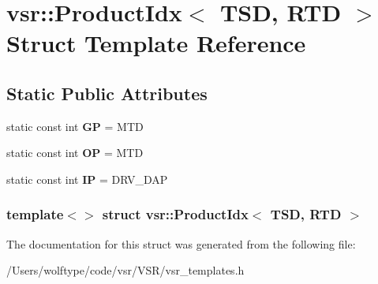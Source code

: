 \hypertarget{structvsr_1_1_product_idx_3_01_t_s_d_00_01_r_t_d_01_4}{\section{vsr\-:\-:Product\-Idx$<$ T\-S\-D, R\-T\-D $>$ Struct Template Reference}
\label{structvsr_1_1_product_idx_3_01_t_s_d_00_01_r_t_d_01_4}
}
\subsection*{Static Public Attributes}
\begin{DoxyCompactItemize}
\item 
\hypertarget{structvsr_1_1_product_idx_3_01_t_s_d_00_01_r_t_d_01_4_a91066ef302dd6b96c6052c85550d9b78}{static const int {\bfseries G\-P} = M\-T\-D}\label{structvsr_1_1_product_idx_3_01_t_s_d_00_01_r_t_d_01_4_a91066ef302dd6b96c6052c85550d9b78}

\item 
\hypertarget{structvsr_1_1_product_idx_3_01_t_s_d_00_01_r_t_d_01_4_a6bd10a7f74a5146d399de562aa26ddcb}{static const int {\bfseries O\-P} = M\-T\-D}\label{structvsr_1_1_product_idx_3_01_t_s_d_00_01_r_t_d_01_4_a6bd10a7f74a5146d399de562aa26ddcb}

\item 
\hypertarget{structvsr_1_1_product_idx_3_01_t_s_d_00_01_r_t_d_01_4_a783fd10b7b99698e62e16bfa3caa828c}{static const int {\bfseries I\-P} = D\-R\-V\-\_\-\-D\-A\-P}\label{structvsr_1_1_product_idx_3_01_t_s_d_00_01_r_t_d_01_4_a783fd10b7b99698e62e16bfa3caa828c}

\end{DoxyCompactItemize}
\subsubsection*{template$<$$>$ struct vsr\-::\-Product\-Idx$<$ T\-S\-D, R\-T\-D $>$}



The documentation for this struct was generated from the following file\-:\begin{DoxyCompactItemize}
\item 
/\-Users/wolftype/code/vsr/\-V\-S\-R/vsr\-\_\-templates.\-h\end{DoxyCompactItemize}
